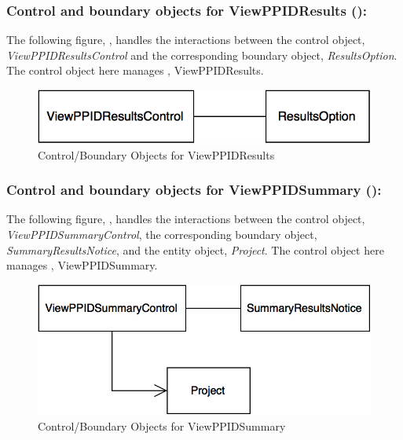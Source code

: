 \documentclass[12pt,letterpaper]{article}
\begin{document}
\newpage{}

\subsubsection*{Control and boundary objects for ViewPPIDResults ():}

The following figure, , handles the interactions between the control object, {\it ViewPPIDResultsControl} and the corresponding boundary object, {\it ResultsOption}. The control object here manages , ViewPPIDResults.

\vspace{1em}

\begin{figure}[H]
	\centering{}
	\includegraphics[scale=0.37]{imgs/cbod/view-ppid-results.png}
	\caption{Control/Boundary Objects for ViewPPIDResults}
\end{figure}

\subsubsection*{Control and boundary objects for ViewPPIDSummary ():}

The following figure, , handles the interactions between the control object, {\it ViewPPIDSummaryControl}, the corresponding boundary object, 
{\it SummaryResultsNotice}, and the entity object, {\it Project}. The control object here manages , ViewPPIDSummary.

\vspace{1em}

\begin{figure}[H]
	\centering{}
	\includegraphics[scale=0.37]{imgs/cbod/view-ppid-summary.png}
	\caption{Control/Boundary Objects for ViewPPIDSummary}
\end{figure}
\end{document}
